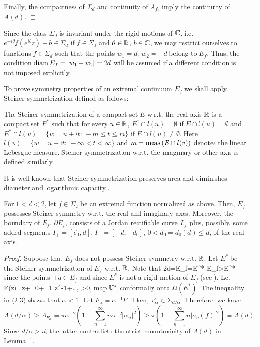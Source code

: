 Finally, the compactness of $\Sigma_d$ and continuity of $A_{f_t}$ imply the continuity of $A(d)$.
$\Box$

Since the class $\Sigma_d$ is invariant under the rigid motions of ${\Bbb {C}}$, i.e. $e^{-i\theta}f(e^{i\theta}z)+b\in \Sigma_d$
if $f\in \Sigma_d$ and $\theta\in {\Bbb{R}}$, $b\in {\Bbb {C}}$, we may restrict ourselves to functions $f\in \Sigma_d$ such that the points
$w_1=d$, $w_2=-d$ belong to $E_f$. Thus, the condition ${\rm diam}\, E_f=|w_1-w_2|=2d$ will be assumed if a different condition 
is not imposed explicitly.

To prove symmetry properties of an extremal continuum $E_f$ we shall apply Steiner symmetrization defined as follows:

The Steiner symmetrization of a compact set $E$ w.r.t. the real axis ${\Bbb{R}}$ is a compact set $E^*$ 
such that for every $u\in {\Bbb{R}}$, $E^*\cap l(u)=\emptyset$ if $E\cap l(u)=\emptyset$ and $E^*\cap l(u)=\{w=u+it:\,-m\le t\le m\}$ if
$E\cap l(u)\not=\emptyset$. Here $l(u)=\{w=u+it:\,-\infty<t<\infty\}$ and $m={\rm meas}\,(E\cap l(u))$ denotes the linear Lebesgue
measure. Steiner symmetrization w.r.t. the imaginary or other axis is defined similarly.

It is well known that Steiner symmetrization preserves area and diminishes diameter and logarithmic capacity \cite{H,D}.

\bl
For $1<d<2$, let $f\in \Sigma_d$ be an extremal function normalized as above. Then, $E_f$ possesses Steiner symmetry w.r.t.
the real and imaginary axes.  Moreover,  the boundary of $E_f$, $\partial E_f$, consists of a Jordan rectifiable curve $L_f$ plus, possibly,
some added segments $I_+=[d_0,d]$, $I_-=[-d,-d_0]$, $0<d_0=d_0(d)\le d$, of the real axis.
\el

{\it Proof}. Suppose that $E_f$ does not possess Steiner symmetry w.r.t. ${\Bbb{R}}$.  Let $E^*$ be the Steiner symmetrization of
$E_f$ w.r.t. ${\Bbb{R}}$. Note that
\be
2d=\diam E_f=\diam E^* \quad \CAP E_f>\CAP E^*
\ee
since the points $\pm d\in E_f$ and since $E^*$ is not a rigid motion of $E_f$  (see \cite{D}). Let
\be
F(z)=\alpha z+\alpha_0+\alpha_1 z^{-1}+\ldots, \quad \alpha>0,
\ee
map ${\Bbb{U}}^*$ conformally onto $\Omega(E^*)$. The inequality in (2.3) shows that $\alpha<1$. Let $F_\alpha=\alpha^{-1}F$. Then, 
$F_\alpha\in \Sigma_{d/\alpha}$.   Therefore, we have
$$
A(d/\alpha)\ge A_{F_\alpha}=\pi \alpha^{-2}(1-\sum_{n=1}^\infty n \alpha^{-2}|\alpha_n|^2) \ge \pi (1-\sum_{n=1}^\infty n |a_n(f)|^2)=A(d).
$$
Since $d/\alpha>d$, the latter contradicts the  strict monotonicity of $A(d)$ in Lemma~1.

